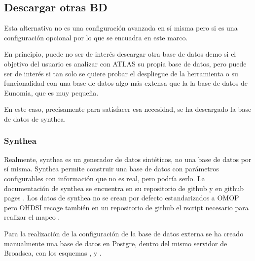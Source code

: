 \subsection{Descargar otras BD} \label{subsec:04OtrasBD}

Esta alternativa no es una configuración avanzada en sí misma pero si es una configuración opcional por lo que se encuadra en este marco. 

En principio, puede no ser de interés descargar otra base de datos demo si el objetivo del usuario es analizar con ATLAS su propia base de datos, pero puede ser de interés si tan solo se quiere probar el despliegue de la herramienta o su funcionalidad con una base de datos algo más extensa que la la base de datos de Eunomia, que es muy pequeña.

En este caso, precisamente para satisfacer esa necesidad, se ha descargado la base de datos de synthea.

\subsubsection{Synthea}

Realmente, synthea es un generador de datos sintéticos, no una base de datos por sí misma. Synthea permite construir una base de datos con parámetros configurables con información que no es real, pero podría serlo. La documentación de synthea se encuentra en su repositorio de github \parencite{githubSynthea} y en github pages \parencite{githubPagesSynthea}. Los datos de synthea no se crean por defecto estandarizados a OMOP pero OHDSI recoge también en un repositorio de github el rscript necesario para realizar el mapeo \parencite{githubETLSynthea}.

Para la realización de la configuración de la base de datos externa se ha creado manualmente una base de datos en Postgre, dentro del mismo servidor de Broadsea, con los esquemas ,  y . 